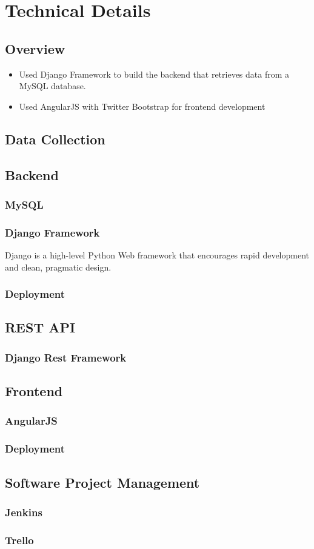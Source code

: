 \chapter{Technical Details}

\section{Overview}
\begin{itemize}
\item Used Django Framework to build the backend that retrieves data from a MySQL database.

\item Used AngularJS with Twitter Bootstrap for frontend development
\end{itemize}

\section{Data Collection}

\section{Backend}
\subsection{MySQL}
\subsection{Django Framework}
\par Django is a high-level Python Web framework that encourages rapid development and clean, pragmatic design\cite{django_framework}.
\subsection{Deployment}

\section{REST API}
\subsection{Django Rest Framework}

\section{Frontend}
\subsection{AngularJS}
\subsection{Deployment}

\section{Software Project Management}
\subsection{Jenkins}
\subsection{Trello}
